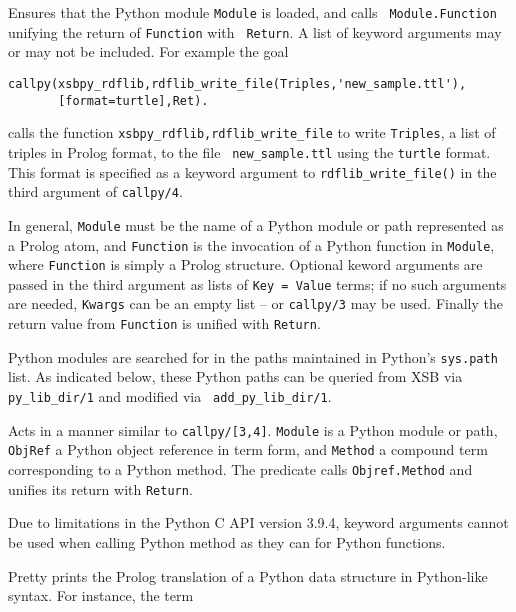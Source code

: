 \begin{description}

%
 Ensures that the Python module {\tt Module} is loaded, and calls {\tt
   Module.Function} unifying the return of {\tt Function} with {\tt
   Return}.  A list of keyword arguments may or may not be included.
 For example the goal

\begin{verbatim}
callpy(xsbpy_rdflib,rdflib_write_file(Triples,'new_sample.ttl'),
       [format=turtle],Ret).
\end{verbatim}

calls the function {\tt xsbpy\_rdflib,rdflib\_write\_file} to write
{\tt Triples}, a list of triples in Prolog format, to the file {\tt
  new\_sample.ttl} using the {\tt turtle} format.  This format is
specified as a keyword argument to {\tt rdflib\_write\_file()} in the
third argument of {\tt callpy/4}.

In general, {\tt Module} must be the name of a Python module or path
represented as a Prolog atom, and {\tt Function} is the invocation of
a Python function in {\tt Module}, where {\tt Function} is simply a
Prolog structure.  Optional keword arguments are passed in the third
argument as lists of {\tt Key = Value} terms; if no such arguments are
needed, {\tt Kwargs} can be an empty list -- or {\tt callpy/3} may be
used.  Finally the return value from {\tt Function} is unified with
{\tt Return}.

Python modules are searched for in the paths maintained in Python's
{\tt sys.path} list.  As indicated below, these Python paths can be
queried from XSB via {\tt py\_lib\_dir/1} and modified via {\tt
  add\_py\_lib\_dir/1}.
     
%
Acts in a manner similar to {\tt callpy/[3,4]}.  {\tt Module} is a
Python module or path, {\tt ObjRef} a Python object reference in term
form, and {\tt Method} a compound term corresponding to a Python
method.  The predicate calls {\tt Objref.Method} and unifies its
return with {\tt Return}.

Due to limitations in the Python C API version 3.9.4, keyword
arguments cannot be used when calling Python method as they can for
Python functions.

%
Pretty prints the Prolog translation of a Python data structure in
Python-like syntax.  For instance, the term


\end{description}
